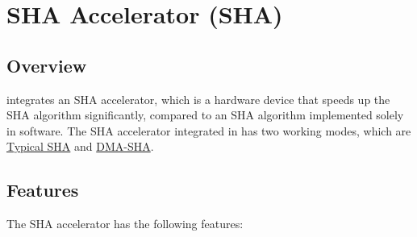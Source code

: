 \documentclass[main\_\_EN.tex]{subfiles}
\begin{document}
\setenglishformatting

\ifglobal
\else
    \clearpage
    \listoftodos
    \listofdonetodos
    \tableofcontents
\fi






\hypertarget{sha}{}
\chapter{SHA Accelerator (SHA)}
\label{mod:sha}


\section{Overview}

\chipname{} integrates an SHA accelerator, which is a hardware device that speeds up the SHA algorithm significantly, compared to an SHA algorithm implemented solely in software. The SHA accelerator integrated in \chipname{} has two working modes, which are  \hyperref[sec:sha-typical-sha]{Typical SHA} and  \hyperref[sec:sha-dma-sha]{DMA-SHA}.


\section{Features}

The SHA accelerator has the following features:
\end{document}
